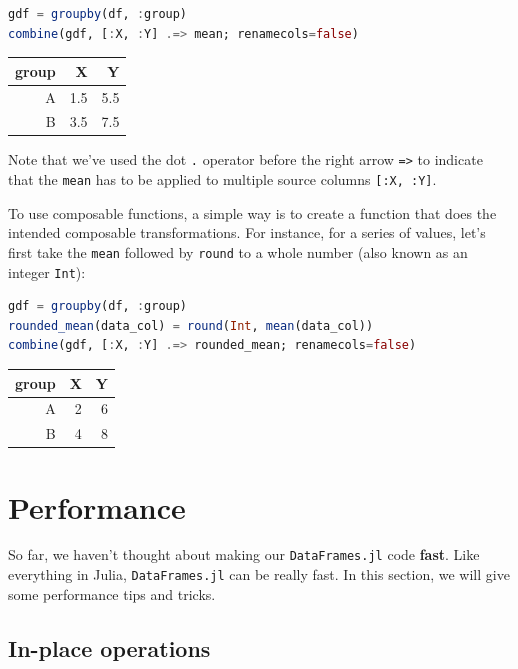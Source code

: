 \documentclass[
  notoc %
]{tufte-book}
\newcommand{\passthrough}[1]{#1}
\begin{document}
\begin{lstlisting}[language=Julia]
gdf = groupby(df, :group)
combine(gdf, [:X, :Y] .=> mean; renamecols=false)
\end{lstlisting}

\begin{longtable}[]{@{}rrr@{}}
\toprule
group & X & Y \\
\midrule
\endhead
A & 1.5 & 5.5 \\
B & 3.5 & 7.5 \\
\bottomrule
\end{longtable}

Note that we've used the dot \passthrough{\lstinline!.!} operator before
the right arrow \passthrough{\lstinline!=>!} to indicate that the
\passthrough{\lstinline!mean!} has to be applied to multiple source
columns \passthrough{\lstinline![:X, :Y]!}.

To use composable functions, a simple way is to create a function that
does the intended composable transformations. For instance, for a series
of values, let's first take the \passthrough{\lstinline!mean!} followed
by \passthrough{\lstinline!round!} to a whole number (also known as an
integer \passthrough{\lstinline!Int!}):

\begin{lstlisting}[language=Julia]
gdf = groupby(df, :group)
rounded_mean(data_col) = round(Int, mean(data_col))
combine(gdf, [:X, :Y] .=> rounded_mean; renamecols=false)
\end{lstlisting}

\begin{longtable}[]{@{}rrr@{}}
\toprule
group & X & Y \\
\midrule
\endhead
A & 2 & 6 \\
B & 4 & 8 \\
\bottomrule
\end{longtable}

\hypertarget{sec:df_performance}{%
\section{Performance}\label{sec:df_performance}}

So far, we haven't thought about making our
\passthrough{\lstinline!DataFrames.jl!} code \textbf{fast}. Like
everything in Julia, \passthrough{\lstinline!DataFrames.jl!} can be
really fast. In this section, we will give some performance tips and
tricks.

\hypertarget{sec:df_performance_inplace}{%
\subsection{In-place operations}\label{sec:df_performance_inplace}}
\end{document}
